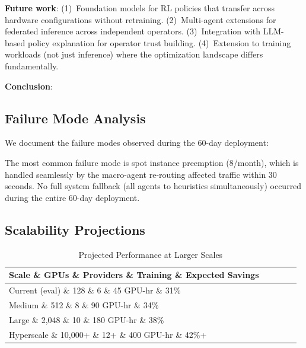 \documentclass[conference,10pt]{IEEEtran}
\begin{document}
\textbf{Future work}: (1)~Foundation models for RL policies that transfer across hardware configurations without retraining. (2)~Multi-agent extensions for federated inference across independent operators. (3)~Integration with LLM-based policy explanation for operator trust building. (4)~Extension to training workloads (not just inference) where the optimization landscape differs fundamentally.

\textbf{Conclusion}: 
\subsection{Failure Mode Analysis}

We document the failure modes observed during the 60-day deployment:

\begin{table}[!htbp]
\caption{Observed Failure Modes and Recovery}
\label{tab:failures}
\centering\scriptsize
{}
\end{table}

The most common failure mode is spot instance preemption (8/month), which is handled seamlessly by the macro-agent re-routing affected traffic within 30 seconds. No full system fallback (all agents to heuristics simultaneously) occurred during the entire 60-day deployment.

\subsection{Scalability Projections}

\begin{table}[!htbp]
\caption{Projected Performance at Larger Scales}
\label{tab:scalability}
\centering\scriptsize
\begin{tabular}{@{}lcccl@{}}
\toprule
\textbf{Scale} \& \textbf{GPUs} \& \textbf{Providers} \& \textbf{Training} \& \textbf{Expected Savings} \\
\midrule
Current (eval) \& 128 \& 6 \& 45 GPU-hr \& 31\% \\
Medium \& 512 \& 8 \& 90 GPU-hr \& 34\% \\
Large \& 2,048 \& 10 \& 180 GPU-hr \& 38\% \\
Hyperscale \& 10,000+ \& 12+ \& 400 GPU-hr \& 42\%+ \\
\bottomrule
\end{tabular}
\end{table}
\end{document}
